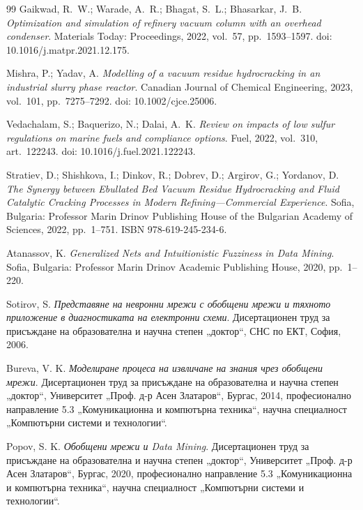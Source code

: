 \begin{thebibliography}{99}
Gaikwad, R.~W.; Warade, A.~R.; Bhagat, S.~L.; Bhasarkar, J.~B.
\newblock \emph{Optimization and simulation of refinery vacuum column with an overhead condenser}.
\newblock Materials Today: Proceedings, 2022, vol.~57, pp.~1593--1597.
\newblock doi: 10.1016/j.matpr.2021.12.175.

Mishra, P.; Yadav, A.
\newblock \emph{Modelling of a vacuum residue hydrocracking in an industrial slurry phase reactor}.
\newblock Canadian Journal of Chemical Engineering, 2023, vol.~101, pp.~7275--7292.
\newblock doi: 10.1002/cjce.25006.

Vedachalam, S.; Baquerizo, N.; Dalai, A.~K.
\newblock \emph{Review on impacts of low sulfur regulations on marine fuels and compliance options}.
\newblock Fuel, 2022, vol.~310, art.~122243.
\newblock doi: 10.1016/j.fuel.2021.122243.

Stratiev, D.; Shishkova, I.; Dinkov, R.; Dobrev, D.; Argirov, G.; Yordanov, D.
\newblock \emph{The Synergy between Ebullated Bed Vacuum Residue Hydrocracking and Fluid Catalytic Cracking Processes in Modern Refining---Commercial Experience}.
\newblock Sofia, Bulgaria: Professor Marin Drinov Publishing House of the Bulgarian Academy of Sciences, 2022, pp.~1--751.
\newblock ISBN 978-619-245-234-6.

Atanassov, K.
\newblock \emph{Generalized Nets and Intuitionistic Fuzziness in Data Mining}.
\newblock Sofia, Bulgaria: Professor Marin Drinov Academic Publishing House, 2020, pp.~1--220.

Sotirov, S.
\newblock \emph{Представяне на невронни мрежи с обобщени мрежи и тяхното приложение в диагностиката на електронни схеми}.
\newblock Дисертационен труд за присъждане на образователна и научна степен „доктор“, СНС по ЕКТ, София, 2006.

Bureva, V. K.
\newblock \emph{Моделиране процеса на извличане на знания чрез обобщени мрежи}.
\newblock Дисертационен труд за присъждане на образователна и научна степен „доктор“, Университет „Проф. д-р Асен Златаров“, Бургас, 2014, професионално направление 5.3 „Комуникационна и компютърна техника“, научна специалност „Компютърни системи и технологии“.

Popov, S. K.
\newblock \emph{Обобщени мрежи и Data Mining}.
\newblock Дисертационен труд за присъждане на образователна и научна степен „доктор“, Университет „Проф. д-р Асен Златаров“, Бургас, 2020, професионално направление 5.3 „Комуникационна и компютърна техника“, научна специалност „Компютърни системи и технологии“.


\end{thebibliography}
